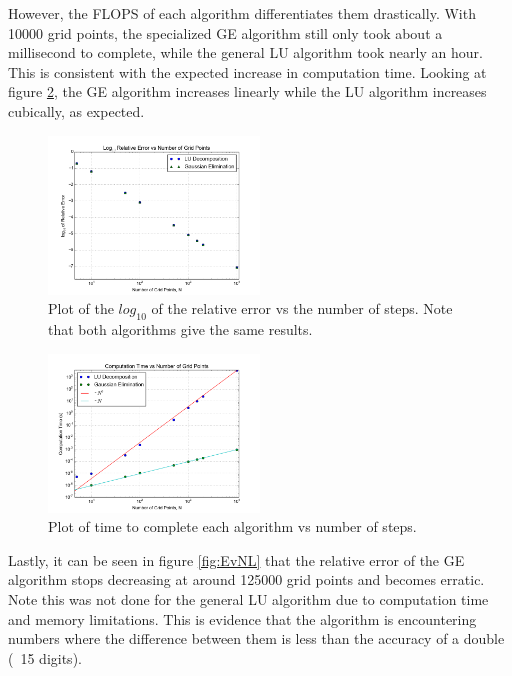 \documentclass[a4paper,12pt]{report}
\begin{document}
However, the FLOPS of each algorithm differentiates them drastically. With 10000 grid points, the specialized GE algorithm still only took about a millisecond to complete, while the general LU algorithm took nearly an hour. This is consistent with the expected increase in computation time. Looking at figure \ref{fig:TvsN}, the GE algorithm increases linearly while the LU algorithm increases cubically, as expected.

\begin{figure}
\centering
 \includegraphics[width=0.5\textwidth]{ErrorVsNPlotBoth.png}
 \caption{Plot of the $log_{10}$ of the relative error vs the number of steps. Note that both algorithms give the same results.}
 \label{fig:EvNB}
\end{figure}

\begin{figure}
\centering
 \includegraphics[width=0.5\textwidth]{TimeVsNPlot.png}
 \caption{Plot of time to complete each algorithm vs number of steps.}
 \label{fig:TvsN}
\end{figure}


Lastly, it can be seen in figure \ref{fig:EvNL} that the relative error of the GE algorithm stops decreasing at around 125000 grid points and becomes erratic. Note this was not done for the general LU algorithm due to computation time and memory limitations. This is evidence that the algorithm is encountering numbers where the difference between them is less than the accuracy of a double (~15 digits).
\end{document}
